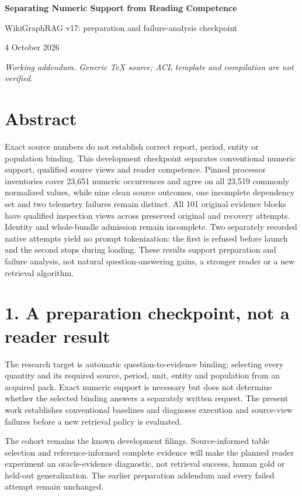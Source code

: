 \documentclass[10pt,a4paper]{article}
\begin{document}
\begin{center}{\Large\bfseries Separating Numeric Support from Reading Competence}\par
WikiGraphRAG v17: preparation and failure-analysis checkpoint\par
4 October 2026\end{center}
\textit{Working addendum. Generic TeX source; ACL template and compilation are not verified.}
\section*{Abstract}
Exact source numbers do not establish correct report, period, entity or population binding. This development checkpoint separates conventional numeric support, qualified source views and reader competence. Pinned processor inventories cover 23,651 numeric occurrences and agree on all 23,519 commonly normalized values, while nine clean source outcomes, one incomplete dependency set and two telemetry failures remain distinct. All 101 original evidence blocks have qualified inspection views across preserved original and recovery attempts. Identity and whole-bundle admission remain incomplete. Two separately recorded native attempts yield no prompt tokenization: the first is refused before launch and the second stops during loading. These results support preparation and failure analysis, not natural question-answering gains, a stronger reader or a new retrieval algorithm.
\section*{1. A preparation checkpoint, not a reader result}
The research target is automatic question-to-evidence binding: selecting every quantity and its required source, period, unit, entity and population from an acquired pack. Exact numeric support is necessary but does not determine whether the selected binding answers a separately written request. The present work establishes conventional baselines and diagnoses execution and source-view failures before a new retrieval policy is evaluated.

The cohort remains the known development filings. Source-informed table selection and reference-informed complete evidence will make the planned reader experiment an oracle-evidence diagnostic, not retrieval success, human gold or held-out generalization. The earlier preparation addendum and every failed attempt remain unchanged.
\end{document}
